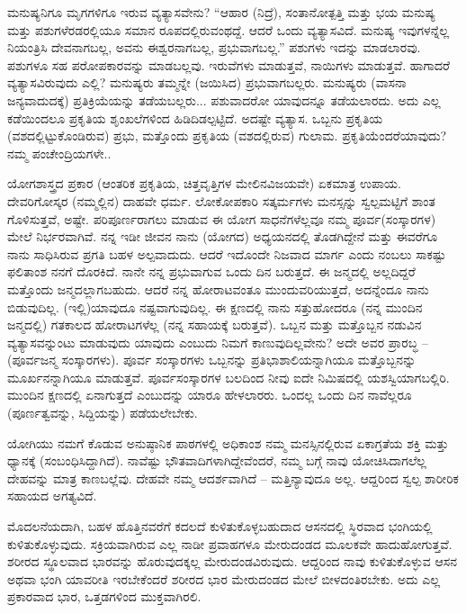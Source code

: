 ಮನುಷ್ಯನಿಗೂ ಮೃಗಗಳಿಗೂ ಇರುವ ವ್ಯತ್ಯಾಸವೇನು? “ಆಹಾರ (ನಿದ್ರೆ), ಸಂತಾನೋತ್ಪತ್ತಿ ಮತ್ತು ಭಯ ಮನುಷ್ಯ ಮತ್ತು ಪಶುಗಳೆರಡರಲ್ಲಿಯೂ ಸಮಾನ ರೂಪದಲ್ಲಿರುವಂಥದ್ದೆ. ಆದರೆ ಒಂದು ವ್ಯತ್ಯಾಸವಿದೆ. ಮನುಷ್ಯ ಇವುಗಳನ್ನೆಲ್ಲ ನಿಯಂತ್ರಿಸಿ ದೇವನಾಗಬಲ್ಲ, ಅವನು ಈಶ್ವರನಾಗಬಲ್ಲ, ಪ್ರಭುವಾಗಬಲ್ಲ.'' ಪಶುಗಳು ಇದನ್ನು ಮಾಡಲಾರವು. ಪಶುಗಳೂ ಸಹ ಪರೋಪಕಾರವನ್ನು ಮಾಡಬಲ್ಲವು. ಇರುವೆಗಳು ಮಾಡುತ್ತವೆ, ನಾಯಿಗಳು ಮಾಡುತ್ತವೆ. ಹಾಗಾದರೆ ವ್ಯತ್ಯಾಸವಿರುವುದು ಎಲ್ಲಿ? ಮನುಷ್ಯರು ತಮ್ಮನ್ನೇ (ಜಯಿಸಿದ) ಪ್ರಭುವಾಗಬಲ್ಲರು. ಮನುಷ್ಯರು (ವಾಸನಾ ಜನ್ಯವಾದುದಕ್ಕೆ) ಪ್ರತಿಕ್ರಿಯೆಯನ್ನು ತಡೆಯಬಲ್ಲರು... ಪಶುವಾದರೋ ಯಾವುದನ್ನೂ ತಡೆಯಲಾರದು. ಅದು ಎಲ್ಲ ಕಡೆಯಿಂದಲೂ ಪ್ರಕೃತಿಯ ಶೃಂಖಲೆಗಳಿಂದ ಹಿಡಿದಿಡಲ್ಪಟ್ಟಿದೆ. ಅದಷ್ಟೇ ವ್ಯತ್ಯಾಸ. ಒಬ್ಬನು ಪ್ರಕೃತಿಯ (ವಶದಲ್ಲಿಟ್ಟುಕೊಂಡಿರುವ) ಪ್ರಭು, ಮತ್ತೊಂದು ಪ್ರಕೃತಿಯ (ವಶದಲ್ಲಿರುವ) ಗುಲಾಮ. ಪ್ರಕೃತಿಯೆಂದರೆ\break ಯಾವುದು? ನಮ್ಮ ಪಂಚೇಂದ್ರಿಯಗಳೇ..

ಯೋಗಶಾಸ್ತ್ರದ ಪ್ರಕಾರ (ಆಂತರಿಕ ಪ್ರಕೃತಿಯ, ಚಿತ್ತವೃತ್ತಿಗಳ ಮೇಲಿನ\break ವಿಜಯವೇ) ಏಕಮಾತ್ರ ಉಪಾಯ. ದೇವರಿಗೋಸ್ಕರ (ನಮ್ಮಲ್ಲಿನ) ದಾಹವೇ ಧರ್ಮ. ಲೋಕೋಪಕಾರಿ ಸತ್ಕರ್ಮಗಳು ಮನಸ್ಸನ್ನು ಸ್ವಲ್ಪಮಟ್ಟಿಗೆ ಶಾಂತ ಗೊಳಿಸುತ್ತವೆ, ಅಷ್ಟೇ. ಪರಿಪೂರ್ಣರಾಗಲು ಮಾಡುವ ಈ ಯೋಗ ಸಾಧನೆಗಳೆಲ್ಲವೂ ನಮ್ಮ ಪೂರ್ವ\break (ಸಂಸ್ಕಾರಗಳ) ಮೇಲೆ ನಿರ್ಭರವಾಗಿವೆ. ನನ್ನ ಇಡೀ ಜೀವನ ನಾನು (ಯೋಗದ) ಅಧ್ಯಯನದಲ್ಲಿ ತೊಡಗಿದ್ದೇನೆ ಮತ್ತು ಈವರೆಗೂ ನಾನು ಸಾಧಿಸಿರುವ ಪ್ರಗತಿ ಬಹಳ ಅಲ್ಪವಾದುದು. ಆದರೆ ಇದೊಂದೇ ನಿಜವಾದ ಮಾರ್ಗ ಎಂದು ನಂಬಲು ಸಾಕಷ್ಟು ಫಲಿತಾಂಶ ನನಗೆ ದೊರಕಿದೆ. ನಾನೇ ನನ್ನ ಪ್ರಭುವಾಗುವ ಒಂದು ದಿನ ಬರುತ್ತದೆ. ಈ ಜನ್ಮದಲ್ಲಿ ಅಲ್ಲದಿದ್ದರೆ ಮತ್ತೊಂದು ಜನ್ಮದಲ್ಲಾಗಬಹುದು. ಆದರೆ ನನ್ನ ಹೋರಾಟವಂತೂ ಮುಂದುವರಿಯುತ್ತದೆ, ಅದನ್ನೆಂದೂ ನಾನು ಬಿಡುವುದಿಲ್ಲ. (ಇಲ್ಲಿ)\break ಯಾವುದೂ ನಷ್ಟವಾಗುವುದಿಲ್ಲ. ಈ ಕ್ಷಣದಲ್ಲಿ ನಾನು ಸತ್ತುಹೋದರೂ (ನನ್ನ ಮುಂದಿನ ಜನ್ಮದಲ್ಲಿ) ಗತಕಾಲದ ಹೋರಾಟಗಳೆಲ್ಲ (ನನ್ನ ಸಹಾಯಕ್ಕೆ ಬರುತ್ತವೆ). ಒಬ್ಬನ ಮತ್ತು ಮತ್ತೊಬ್ಬನ ನಡುವಿನ ವ್ಯತ್ಯಾಸವನ್ನುಂಟು ಮಾಡುವುದು ಯಾವುದು ಎಂಬುದು ನಿಮಗೆ ಕಾಣುವುದಿಲ್ಲವೇನು? ಅದೇ ಅವರ ಪ್ರಾರಬ್ಧ – (ಪೂರ್ವಜನ್ಮ ಸಂಸ್ಕಾರಗಳು). ಪೂರ್ವ ಸಂಸ್ಕಾರಗಳು ಒಬ್ಬನನ್ನು ಪ್ರತಿಭಾಶಾಲಿಯನ್ನಾಗಿಯೂ ಮತ್ತೊಬ್ಬನನ್ನು ಮೂರ್ಖನನ್ನಾಗಿಯೂ ಮಾಡುತ್ತವೆ. ಪೂರ್ವಸಂಸ್ಕಾರಗಳ ಬಲದಿಂದ ನೀವು ಐದೇ ನಿಮಿಷದಲ್ಲಿ ಯಶಸ್ವಿಯಾಗಬಲ್ಲಿರಿ. ಮುಂದಿನ ಕ್ಷಣದಲ್ಲಿ ಏನಾಗುತ್ತದೆ ಎಂಬುದನ್ನು ಯಾರೂ ಹೇಳಲಾರರು. ಒಂದಲ್ಲ ಒಂದು ದಿನ ನಾವೆಲ್ಲರೂ (ಪೂರ್ಣತ್ವವನ್ನು, ಸಿದ್ದಿಯನ್ನು) ಪಡೆಯಲೇಬೇಕು.

ಯೋಗಿಯು ನಮಗೆ ಕೊಡುವ ಅನುಷ್ಠಾನಿಕ ಪಾಠಗಳಲ್ಲಿ ಅಧಿಕಾಂಶ ನಮ್ಮ ಮನಸ್ಸಿನಲ್ಲಿರುವ ಏಕಾಗ್ರತೆಯ ಶಕ್ತಿ ಮತ್ತು ಧ್ಯಾನಕ್ಕೆ (ಸಂಬಂಧಿಸಿದ್ದಾಗಿದೆ). ನಾವೆಷ್ಟು ಭೌತವಾದಿಗಳಾಗಿದ್ದೇವೆಂದರೆ, ನಮ್ಮ ಬಗ್ಗೆ ನಾವು ಯೋಚಿಸಿದಾಗಲೆಲ್ಲ ದೇಹವನ್ನು ಮಾತ್ರ ಕಾಣಬಲ್ಲೆವು. ದೇಹವೇ ನಮ್ಮ ಆದರ್ಶವಾಗಿದೆ – ಮತ್ತಿನ್ಯಾವುದೂ ಅಲ್ಲ. ಆದ್ದರಿಂದ ಸ್ವಲ್ಪ ಶಾರೀರಿಕ ಸಹಾಯದ ಅಗತ್ಯವಿದೆ.

ಮೊದಲನೆಯದಾಗಿ, ಬಹಳ ಹೊತ್ತಿನವರೆಗೆ ಕದಲದೆ ಕುಳಿತುಕೊಳ್ಳಬಹುದಾದ ಆಸನದಲ್ಲಿ ಸ್ಥಿರವಾದ ಭಂಗಿಯಲ್ಲಿ ಕುಳಿತುಕೊಳ್ಳುವುದು. ಸಕ್ರಿಯವಾಗಿರುವ ಎಲ್ಲ ನಾಡೀ ಪ್ರವಾಹಗಳೂ ಮೇರುದಂಡದ ಮೂಲಕವೇ ಹಾದುಹೋಗುತ್ತವೆ. ಶರೀರದ ಸ್ಥೂಲವಾದ ಭಾರವನ್ನು ಹೊರುವುದಕ್ಕಲ್ಲ ಮೇರುದಂಡವಿರುವುದು. ಆದ್ದರಿಂದ ನಾವು ಕುಳಿತುಕೊಳ್ಳುವ ಆಸನ ಅಥವಾ ಭಂಗಿ ಯಾವರೀತಿ ಇರಬೇಕೆಂದರೆ ಶರೀರದ ಭಾರ ಮೇರುದಂಡದ ಮೇಲೆ ಬೀಳದಂತಿರಬೇಕು. ಅದು ಎಲ್ಲ ಪ್ರಕಾರವಾದ ಭಾರ, ಒತ್ತಡಗಳಿಂದ ಮುಕ್ತವಾಗಿರಲಿ.

